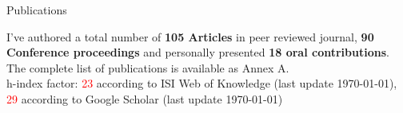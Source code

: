 \begin{cvblock}{Publications}
\end{cvblock}
I've authored a total number of \textbf{105 Articles} in peer reviewed journal,
\textbf{90 Conference proceedings} and personally presented \textbf{18 oral
contributions}. The complete list of publications is available as
Annex A. \\
h-index factor: \textcolor{red}{23} according to ISI Web of Knowledge
(last update \today), \textcolor{red}{29} according to Google Scholar (last update \today)

